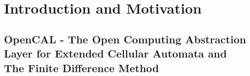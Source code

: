 
\section{Introduction and Motivation}
\subsection[OpenCAL]{OpenCAL - The Open Computing Abstraction Layer for Extended Cellular Automata and The Finite Difference Method} 
